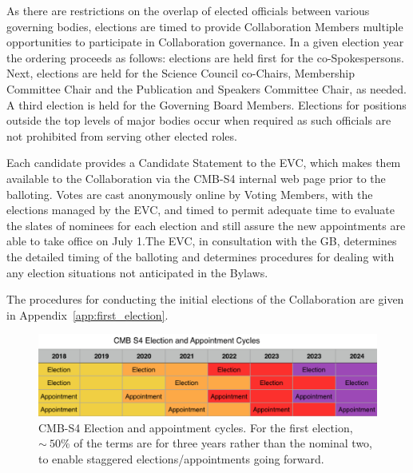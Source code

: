 \documentclass[12pt]{article}
\begin{document}
As there are restrictions on the overlap of elected officials between various governing bodies, elections are timed to provide Collaboration Members multiple opportunities to participate in Collaboration governance. 
In a given election year the ordering proceeds as follows: elections are held first for the co-Spokespersons. Next, elections are held for the Science Council co-Chairs, Membership Committee Chair and the Publication and Speakers Committee Chair, as needed.  A third election is held for the Governing Board Members. 
Elections for positions outside the top levels of major bodies occur when required as such officials are not prohibited from serving other elected roles. 

Each candidate provides a Candidate Statement to the EVC, which makes them available to the Collaboration via the CMB-S4 internal web page prior to the balloting.   Votes are cast anonymously online by Voting Members, with the elections managed by the EVC, and timed to permit adequate time to evaluate the slates of nominees for each election and still assure the new appointments are able to take office on July 1.The EVC, in consultation with the GB,  determines the detailed timing of the balloting and determines procedures for dealing with any election situations not anticipated in the Bylaws.

The procedures for conducting the initial elections of the Collaboration are given in Appendix~\ref{app:first_election}.



\begin{figure}[h!]
\begin{center}
\includegraphics[width=6.5in]{Election_cycle_v2.png}
\end{center}
\caption{CMB-S4 Election and appointment cycles. For the first election, $\sim\ 50$\% of the terms are for three years rather than the nominal two, to enable staggered elections/appointments going forward.}
\label{fig:elect_cycle}
\end{figure}

\end{document}
